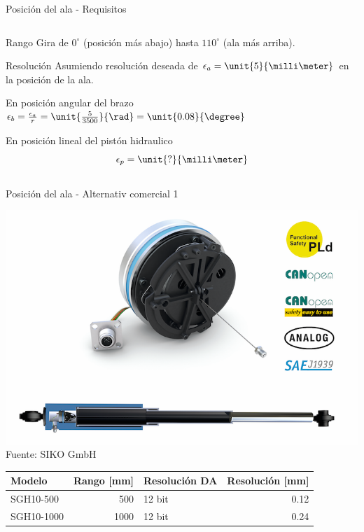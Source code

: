 \documentclass[presentation,aspectratio=169]{beamer}
\begin{document}
\begin{frame}[label={sec:org9174ccf}]{Posición del ala - Requisitos}
\begin{columns}
\begin{column}{0.5\columnwidth}
\begin{block}{Rango}
Gira de \(0^\circ\) (posición más abajo) hasta \(110^\circ\) (ala más arriba).
\end{block}

\begin{block}{Resolución}
Asumiendo resolución deseada de \(\epsilon_a = \unit{5}{\milli\meter}\) en la posición de la ala.

\begin{block}{En posición angular del brazo}
\(\epsilon_b = \frac{\epsilon_a}{r} = \unit{\frac{5}{3500}}{\rad} = \unit{0.08}{\degree}\)
\end{block}
\begin{block}{En posición lineal del pistón hidraulico}
\[ \epsilon_p = \unit{?}{\milli\meter}\]
\end{block}
\end{block}
\end{column}
\end{columns}
\end{frame}

\begin{frame}[label={sec:org43f076f}]{Posición del ala - Alternativ comercial 1}
\begin{center}
\includegraphics[width=0.3\linewidth]{../../figures/PosSensor.png}\\
{\footnotesize Fuente: SIKO GmbH}
\end{center}

\begin{center}
\begin{tabular}{lrlr}
Modelo & Rango [mm] & Resolución DA & Resolución [mm]\\
\hline
SGH10-500 & 500 & 12 bit & 0.12\\
SGH10-1000 & 1000 & 12 bit & 0.24\\
\end{tabular}
\end{center}
\end{frame}
\end{document}
